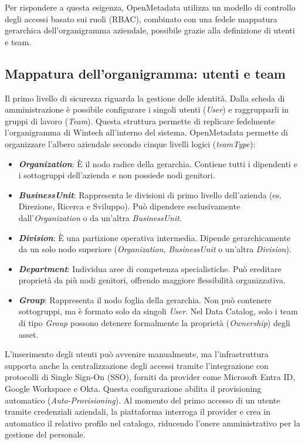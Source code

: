 Per rispondere a questa esigenza, OpenMetadata utilizza un modello di controllo degli accessi basato sui ruoli (RBAC), combinato con una fedele mappatura 
gerarchica dell'organigramma aziendale, possibile grazie alla definizione di utenti e team.

\subsection{Mappatura dell'organigramma: utenti e team}
Il primo livello di sicurezza riguarda la gestione delle identità. Dalla scheda di amministrazione è possibile configurare i singoli utenti (\emph{User}) e 
raggrupparli in gruppi di lavoro (\emph{Team}). Questa struttura permette di replicare fedelmente l'organigramma di Wintech all'interno del sistema. 
OpenMetadata permette di organizzare l'albero aziendale secondo cinque livelli logici (\emph{teamType}):
\begin{itemize}
    \item \textbf{\emph{Organization}}: È il nodo radice della gerarchia. Contiene tutti i dipendenti e i sottogruppi dell'azienda e non possiede nodi genitori.
    \item \textbf{\emph{BusinessUnit}}: Rappresenta le divisioni di primo livello dell'azienda (es. Direzione, Ricerca e Sviluppo). Può dipendere esclusivamente dall'\emph{Organization} o da un'altra \emph{BusinessUnit}.
    \item \textbf{\emph{Division}}: È una partizione operativa intermedia. Dipende gerarchicamente da un solo nodo superiore (\emph{Organization}, \emph{BusinessUnit} o un'altra \emph{Division}).
    \item \textbf{\emph{Department}}: Individua aree di competenza specialistiche. Può ereditare proprietà da più nodi genitori, offrendo maggiore flessibilità organizzativa.
    \item \textbf{\emph{Group}}: Rappresenta il nodo foglia della gerarchia. Non può contenere sottogruppi, ma è formato solo da singoli \emph{User}. Nel Data Catalog, solo i team di tipo \emph{Group} possono detenere formalmente la proprietà (\emph{Ownership}) degli asset.
\end{itemize}

L'inserimento degli utenti può avvenire manualmente, ma l'infrastruttura supporta anche la centralizzazione degli accessi tramite l'integrazione con protocolli di 
Single Sign-On (SSO), forniti da provider come Microsoft Entra ID, Google Workspace e Okta. 
Questa configurazione abilita il provisioning automatico (\emph{Auto-Provisioning}). Al momento del primo accesso di un utente tramite credenziali aziendali, 
la piattaforma interroga il provider e crea in automatico il relativo profilo nel catalogo, riducendo l'onere amministrativo per la gestione del personale.

